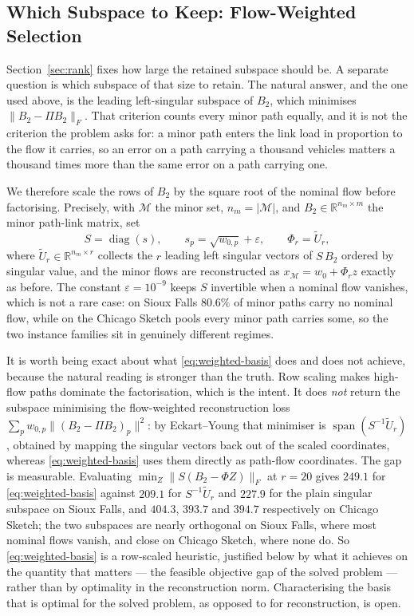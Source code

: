 \documentclass[11pt]{article}
\begin{document}
\subsection{Which Subspace to Keep: Flow-Weighted Selection}
\label{sec:weighted-basis}

Section~\ref{sec:rank} fixes how large the retained subspace should be. A separate question is
which subspace of that size to retain. The natural answer, and the one used above, is the
leading left-singular subspace of $B_2$, which minimises $\|B_2 - \Pi B_2\|_F$. That criterion
counts every minor path equally, and it is not the criterion the problem asks for: a minor path
enters the link load in proportion to the flow it carries, so an error on a path carrying a
thousand vehicles matters a thousand times more than the same error on a path carrying one.

We therefore scale the rows of $B_2$ by the square root of the nominal flow before
factorising. Precisely, with $\mathcal M$ the minor set, $n_m=|\mathcal M|$, and
$B_2\in\mathbb R^{n_m\times m}$ the minor path-link matrix, set
\begin{equation}
\label{eq:weighted-basis}
S=\operatorname{diag}(s),\qquad s_p=\sqrt{w_{0,p}}+\varepsilon,\qquad
\Phi_r=\widetilde U_r,
\end{equation}
where $\widetilde U_r\in\mathbb R^{n_m\times r}$ collects the $r$ leading left singular
vectors of $S\,B_2$ ordered by singular value, and the minor flows are reconstructed as
$x_{\mathcal M}=w_0+\Phi_r z$ exactly as before. The constant $\varepsilon=10^{-9}$ keeps $S$
invertible when a nominal flow vanishes, which is not a rare case: on Sioux Falls $80.6\%$ of
minor paths carry no nominal flow, while on the Chicago Sketch pools every minor path carries
some, so the two instance families sit in genuinely different regimes.

It is worth being exact about what \eqref{eq:weighted-basis} does and does not achieve, because
the natural reading is stronger than the truth. Row scaling makes high-flow paths dominate the
factorisation, which is the intent. It does \emph{not} return the subspace minimising the
flow-weighted reconstruction loss $\sum_p w_{0,p}\|(B_2-\Pi B_2)_p\|^2$: by Eckart--Young that
minimiser is $\operatorname{span}(S^{-1}\widetilde U_r)$, obtained by mapping the singular
vectors back out of the scaled coordinates, whereas \eqref{eq:weighted-basis} uses them
directly as path-flow coordinates. The gap is measurable. Evaluating
$\min_Z\|S(B_2-\Phi Z)\|_F$ at $r=20$ gives $249.1$ for \eqref{eq:weighted-basis} against
$209.1$ for $S^{-1}\widetilde U_r$ and $227.9$ for the plain singular subspace on Sioux Falls,
and $404.3$, $393.7$ and $394.7$ respectively on Chicago Sketch; the two subspaces are nearly
orthogonal on Sioux Falls, where most nominal flows vanish, and close on Chicago Sketch, where
none do. So \eqref{eq:weighted-basis} is a row-scaled heuristic, justified below by what it
achieves on the quantity that matters --- the feasible objective gap of the solved problem ---
rather than by optimality in the reconstruction norm. Characterising the basis that is optimal
for the solved problem, as opposed to for reconstruction, is open.
\end{document}
